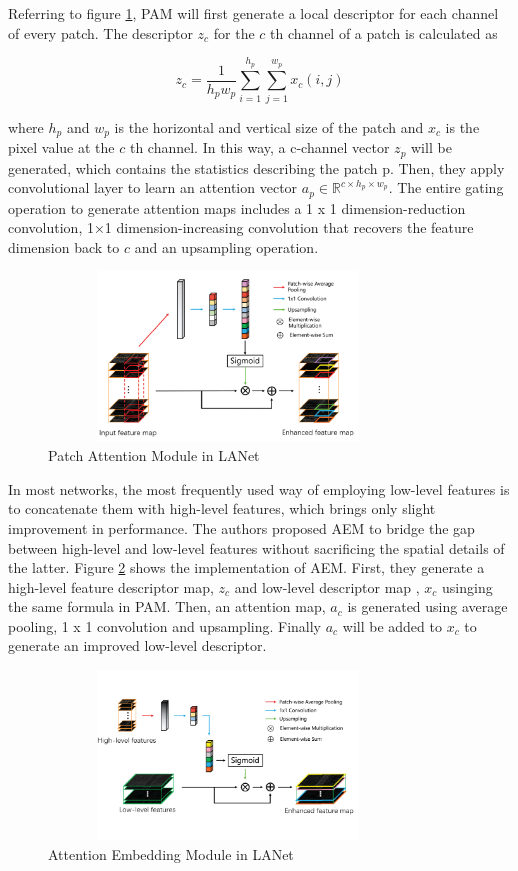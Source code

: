 \FloatBarrier

Referring to figure \ref{fig:pam}, PAM will first generate a local descriptor for each channel of every patch. The descriptor $z_c$ for the $c$ th channel of a patch is calculated as

\begin{equation}
    z_c = \frac{1}{h_p w_p} \sum_{i=1}^{h_p} \sum_{j=1}^{w_p} x_c(i,j)
\end{equation}

where $h_p$ and $w_p$ is the horizontal and vertical size of the patch and $x_c$ is the pixel value at the $c$ th channel. In this way, a c-channel vector $z_p$ will be generated, which contains the statistics describing the patch p. Then, they apply convolutional layer to learn an attention vector $a_p \in \mathbb{R}^{c \times h_p \times w_p}$. The entire gating operation to generate attention maps includes a 1 x 1 dimension-reduction convolution, 1×1 dimension-increasing convolution that recovers the feature dimension back to $c$ and an upsampling operation.
\begin{figure}[ht]
\includegraphics[width=9.5cm, height=4.5cm]{images/pam.png}
\centering
\caption{Patch Attention Module in LANet}
\label{fig:pam}
\end{figure}
\FloatBarrier



In most networks, the most frequently used way of employing low-level features is to concatenate them with high-level features, which brings only slight improvement in performance. The authors proposed AEM to bridge the gap between high-level and low-level features without sacrificing the spatial details of the latter. Figure \ref{fig:aem} shows the implementation of AEM. First, they generate a high-level feature descriptor map, $z_c$ and low-level descriptor map , $x_c$ usinging the same formula in PAM. Then, an attention map, $a_c$ is generated using average pooling, 1 x 1 convolution and upsampling. Finally $a_c$ will be added to $x_c$ to generate an improved low-level descriptor.  
\begin{figure}[ht]
\includegraphics[width=9.5cm, height=4.5cm]{images/aem.png}
\centering
\caption{Attention Embedding Module in LANet}
\label{fig:aem}
\end{figure}
\FloatBarrier



